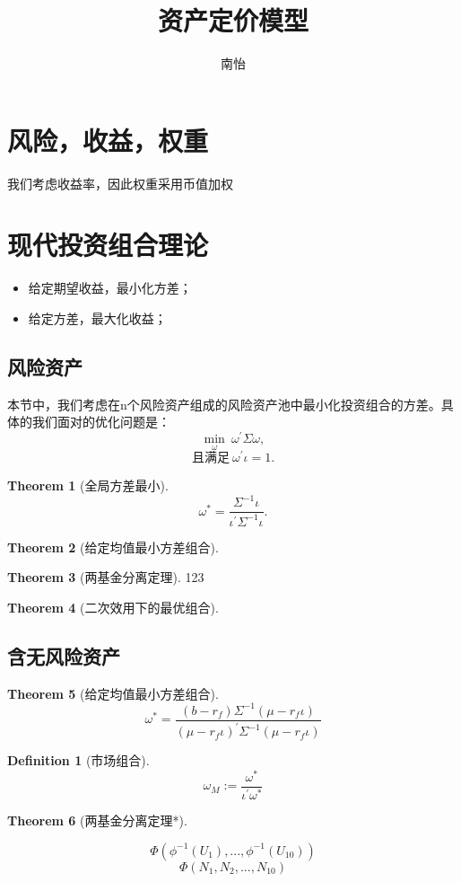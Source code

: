 \documentclass[11pt]{article}
\theoremstyle{definition}
\newtheorem{definition}{Definition}[section]
\newtheorem{theorem}{Theorem}[section]
\begin{document}
 
\title{资产定价模型}
\author{南怡}
\maketitle

\tableofcontents
\newpage

\section{风险，收益，权重}
我们考虑收益率，因此权重采用币值加权
\section{现代投资组合理论}
\begin{itemize}
	\item 给定期望收益，最小化方差；
	\item 给定方差，最大化收益；
\end{itemize}
\subsection{风险资产}
本节中，我们考虑在n个风险资产组成的风险资产池中最小化投资组合的方差。具体的我们面对的优化问题是：
$$
\min_{\omega} \ \omega^\prime \Sigma \omega,
$$
$$
\text{且满足} \ \omega^\prime \iota =1.
$$

\begin{theorem}[全局方差最小]
$$
	\omega^*  = \frac{\Sigma^{-1}\iota}{\iota^\prime \Sigma^{-1} \iota}.
$$	
\end{theorem}


\begin{theorem}[给定均值最小方差组合]
	
\end{theorem}

\begin{theorem}[两基金分离定理]
123	
\end{theorem}

\begin{theorem}[二次效用下的最优组合]
	
\end{theorem}

\subsection{含无风险资产}
\begin{theorem}[给定均值最小方差组合]
$$
	\omega^* = \frac{(b-r_f)\Sigma^{-1}(\mu-r_f\iota)}{(\mu-r_f\iota)^\prime\Sigma^{-1}(\mu-r_f\iota)}
$$
\end{theorem}

\begin{definition}[市场组合]
$$
\omega_M := \frac{\omega^*}{\iota^\prime \omega^*}
$$
\end{definition}

\begin{theorem}[两基金分离定理*]
	
\end{theorem}
$$
\Phi(\phi^{-1}(U_1),...,\phi^{-1}(U_{10}))
$$
$$
\Phi(N_1,N_2,...,N_{10})
$$
\end{document}
